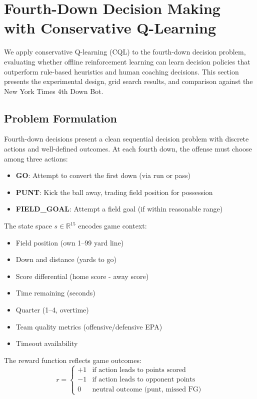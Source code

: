 \section{Fourth-Down Decision Making with Conservative Q-Learning}
\label{sec:fourth-down-cql}

We apply conservative Q-learning (CQL) to the fourth-down decision problem, evaluating whether offline reinforcement learning can learn decision policies that outperform rule-based heuristics and human coaching decisions. This section presents the experimental design, grid search results, and comparison against the New York Times 4th Down Bot.

\subsection{Problem Formulation}

Fourth-down decisions present a clean sequential decision problem with discrete actions and well-defined outcomes. At each fourth down, the offense must choose among three actions:
\begin{itemize}
    \item \textbf{GO}: Attempt to convert the first down (via run or pass)
    \item \textbf{PUNT}: Kick the ball away, trading field position for possession
    \item \textbf{FIELD\_GOAL}: Attempt a field goal (if within reasonable range)
\end{itemize}

The state space $s \in \mathbb{R}^{15}$ encodes game context:
\begin{itemize}
    \item Field position (own 1--99 yard line)
    \item Down and distance (yards to go)
    \item Score differential (home score - away score)
    \item Time remaining (seconds)
    \item Quarter (1--4, overtime)
    \item Team quality metrics (offensive/defensive EPA)
    \item Timeout availability
\end{itemize}

The reward function reflects game outcomes:
\[
r = \begin{cases}
+1 & \text{if action leads to points scored} \\
-1 & \text{if action leads to opponent points} \\
0 & \text{neutral outcome (punt, missed FG)}
\end{cases}
\]

